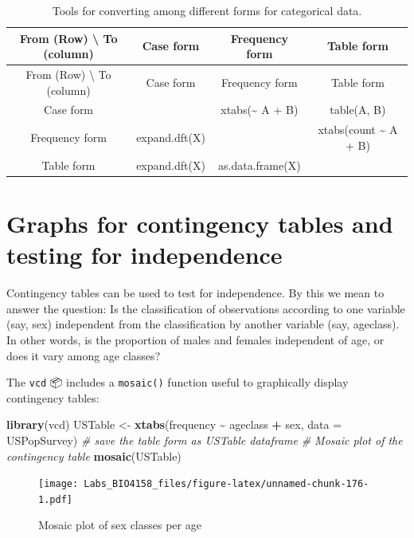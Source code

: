 \documentclass[
  12pt,
]{book}
\newenvironment{Shaded}{\begin{snugshade}}{\end{snugshade}}
\newcommand{\CommentTok}[1]{\textcolor[rgb]{0.56,0.35,0.01}{\textit{#1}}}
\newcommand{\DataTypeTok}[1]{\textcolor[rgb]{0.13,0.29,0.53}{#1}}
\newcommand{\KeywordTok}[1]{\textcolor[rgb]{0.13,0.29,0.53}{\textbf{#1}}}
\newcommand{\NormalTok}[1]{#1}
\newcommand{\OperatorTok}[1]{\textcolor[rgb]{0.81,0.36,0.00}{\textbf{#1}}}
\newcommand{\StringTok}[1]{\textcolor[rgb]{0.31,0.60,0.02}{#1}}
\begin{document}
\begin{longtable}[]{@{}cccc@{}}
\caption{\label{tab:unnamed-chunk-1}Tools for converting among different forms for categorical data.}\tabularnewline
\toprule
From (Row) \textbackslash{} To (column) & Case form & Frequency form & Table form\tabularnewline
\midrule
\endfirsthead
\toprule
From (Row) \textbackslash{} To (column) & Case form & Frequency form & Table form\tabularnewline
\midrule
\endhead
Case form & & xtabs(\textasciitilde{} A + B) & table(A, B)\tabularnewline
Frequency form & expand.dft(X) & & xtabs(count \textasciitilde{} A + B)\tabularnewline
Table form & expand.dft(X) & as.data.frame(X) &\tabularnewline
\bottomrule
\end{longtable}

\hypertarget{graphs-for-contingency-tables-and-testing-for-independence}{%
\section{Graphs for contingency tables and testing for independence}\label{graphs-for-contingency-tables-and-testing-for-independence}}

Contingency tables can be used to test for independence. By this we mean to answer the question: Is the classification of observations according to one variable (say, sex) independent from the classification by another variable (say, ageclass). In other words, is the proportion of males and females independent of age, or does it vary among age classes?

The \texttt{vcd} 📦 includes a \texttt{mosaic()} function useful to graphically display contingency tables:

\begin{Shaded}
\begin{Highlighting}[]
\KeywordTok{library}\NormalTok{(vcd)}
\NormalTok{USTable \textless{}{-}}\StringTok{ }\KeywordTok{xtabs}\NormalTok{(frequency }\OperatorTok{\textasciitilde{}}\StringTok{ }\NormalTok{ageclass }\OperatorTok{+}\StringTok{ }\NormalTok{sex, }\DataTypeTok{data =}\NormalTok{ USPopSurvey) }\CommentTok{\# save the table form as USTable dataframe}
\CommentTok{\# Mosaic plot of the contingency table}
\KeywordTok{mosaic}\NormalTok{(USTable)}
\end{Highlighting}
\end{Shaded}

\begin{figure}
\centering
\texttt{[image: Labs\_BIO4158\_files/figure-latex/unnamed-chunk-176-1.pdf]}
\caption{\label{fig:unnamed-chunk-176}Mosaic plot of sex classes per age}
\end{figure}
\end{document}
